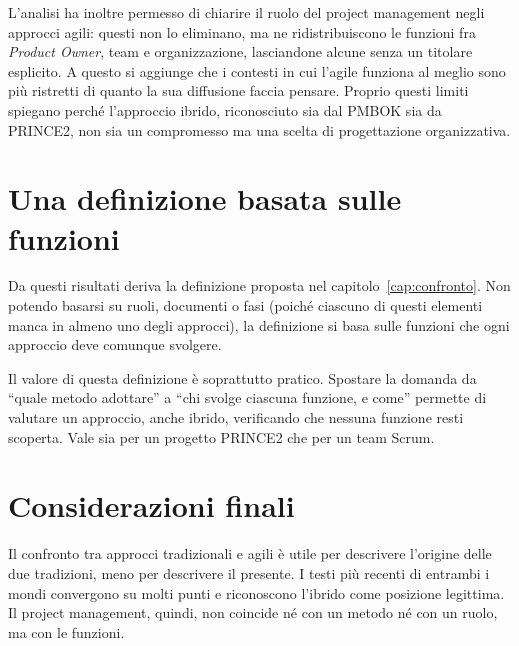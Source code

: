 L'analisi ha inoltre permesso di chiarire il ruolo del project management
negli approcci agili: questi non lo eliminano, ma ne ridistribuiscono le
funzioni fra
\emph{Product Owner}, team e organizzazione, lasciandone alcune senza un
titolare esplicito. A questo si aggiunge che i contesti in cui l'agile
funziona al meglio sono pi\`u ristretti di quanto la sua
diffusione faccia pensare. Proprio questi limiti spiegano perch\'e l'approccio
ibrido, riconosciuto sia dal PMBOK sia da PRINCE2, non sia un compromesso ma una
scelta di progettazione organizzativa.

\section*{Una definizione basata sulle funzioni}

Da questi risultati deriva la definizione proposta nel
capitolo~\ref{cap:confronto}. Non potendo basarsi su ruoli, documenti o fasi
(poich\'e ciascuno di questi elementi manca in almeno uno degli
approcci), la definizione si basa sulle funzioni che ogni approccio deve comunque
svolgere.

Il valore di questa definizione \`e soprattutto pratico. Spostare la domanda
da ``quale metodo adottare'' a ``chi svolge ciascuna funzione, e come'' permette
di valutare un approccio, anche ibrido, verificando che nessuna funzione resti
scoperta. Vale sia per un progetto PRINCE2 che per un team Scrum.

\section*{Considerazioni finali}

Il confronto tra approcci tradizionali e agili \`e utile per descrivere
l'origine delle due tradizioni, meno per descrivere il presente. I testi pi\`u
recenti di entrambi i mondi convergono su molti punti e riconoscono l'ibrido
come posizione legittima. Il project management, quindi, non
coincide n\'e con un metodo n\'e con un ruolo, ma con le funzioni.
